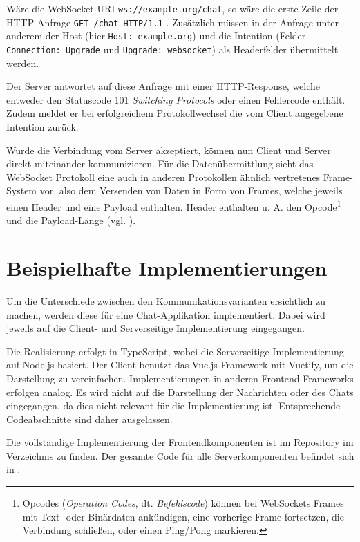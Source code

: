 \documentclass[sigplan, screen]{acmart}
\begin{document}
Wäre die WebSocket URI \texttt{ws://example.org/chat}, so wäre die erste Zeile der HTTP-Anfrage \texttt{GET /chat HTTP/1.1} \cite[Abs. 4.1]{melnikov_websocket_2011}.
Zusätzlich müssen in der Anfrage unter anderem der Host (hier \texttt{Host: example.org}) und die Intention (Felder \texttt{Connection: Upgrade} und \texttt{Upgrade: websocket}) als Headerfelder übermittelt werden.

Der Server antwortet auf diese Anfrage mit einer HTTP-Response, welche entweder den Statuscode 101 \emph{Switching Protocols} oder einen Fehlercode enthält.
Zudem meldet er bei erfolgreichem Protokollwechsel die vom Client angegebene Intention zurück.

Wurde die Verbindung vom Server akzeptiert, können nun Client und Server direkt miteinander kommunizieren.
Für die Datenübermittlung sieht das WebSocket Protokoll eine auch in anderen Protokollen ähnlich vertretenes Frame-System vor,
also dem Versenden von Daten in Form von Frames, welche jeweils einen Header und eine Payload enthalten.
Header enthalten u. A. den Opcode\footnote{Opcodes (\emph{Operation Codes}, dt. \emph{Befehlscode}) können bei WebSockets Frames mit Text- oder Binärdaten ankündigen, eine vorherige Frame fortsetzen, die Verbindung schließen, oder einen Ping/Pong markieren.} und die Payload-Länge (vgl. \cite[Abs. 5.2]{melnikov_websocket_2011}).


\section{Beispielhafte Implementierungen}

Um die Unterschiede zwischen den Kommunikationsvarianten ersichtlich zu machen, werden diese für eine Chat-Applikation implementiert.
Dabei wird jeweils auf die Client- und Serverseitige Implementierung eingegangen.

Die Realisierung erfolgt in TypeScript, wobei die Serverseitige Implementierung auf Node.js basiert.
Der Client benutzt das Vue.js-Framework mit Vuetify, um die Darstellung zu vereinfachen.
Implementierungen in anderen Frontend-Frameworks erfolgen analog.
Es wird nicht auf die Darstellung der Nachrichten oder des Chats eingegangen, da dies nicht relevant für die Implementierung ist.
Entsprechende Codeabschnitte sind daher ausgelassen.

Die vollständige Implementierung der Frontendkomponenten ist im Repository im Verzeichnis \cite[\\\texttt{code/client/src/components/}]{wagner_seminar2022_2022} zu finden.
Der gesamte Code für alle Serverkomponenten befindet sich in \cite[\\\texttt{code/server/chatserver.ts}]{wagner_seminar2022_2022}.
\end{document}
